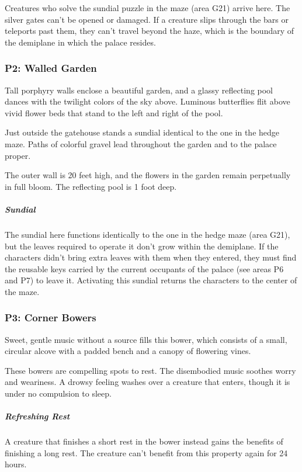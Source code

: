 \documentclass[10pt,a4paper,twoside,bg=print,twocolumn,openany,nodeprecatedcode]{dndbook}
\begin{document}
Creatures who solve the sundial puzzle in the maze (area G21) arrive here. The silver gates can't be opened or damaged. If a creature slips through the bars or teleports past them, they can't travel beyond the haze, which is the boundary of the demiplane in which the palace resides.

\subsubsection{P2: Walled Garden}
\begin{DndReadAloud}{}
Tall porphyry walls enclose a beautiful garden, and a glassy reflecting pool dances with the twilight colors of the sky above. Luminous butterflies flit above vivid flower beds that stand to the left and right of the pool.

Just outside the gatehouse stands a sundial identical to the one in the hedge maze. Paths of colorful gravel lead throughout the garden and to the palace proper.

\end{DndReadAloud}

The outer wall is 20 feet high, and the flowers in the garden remain perpetually in full bloom. The reflecting pool is 1 foot deep.

\subparagraph{Sundial}
The sundial here functions identically to the one in the hedge maze (area G21), but the leaves required to operate it don't grow within the demiplane. If the characters didn't bring extra leaves with them when they entered, they must find the reusable keys carried by the current occupants of the palace (see areas P6 and P7) to leave it. Activating this sundial returns the characters to the center of the maze.

\subsubsection{P3: Corner Bowers}
\begin{DndReadAloud}{}
Sweet, gentle music without a source fills this bower, which consists of a small, circular alcove with a padded bench and a canopy of flowering vines.

\end{DndReadAloud}

These bowers are compelling spots to rest. The disembodied music soothes worry and weariness. A drowsy feeling washes over a creature that enters, though it is under no compulsion to sleep.

\subparagraph{Refreshing Rest}
A creature that finishes a short rest in the bower instead gains the benefits of finishing a long rest. The creature can't benefit from this property again for 24 hours.
\end{document}
